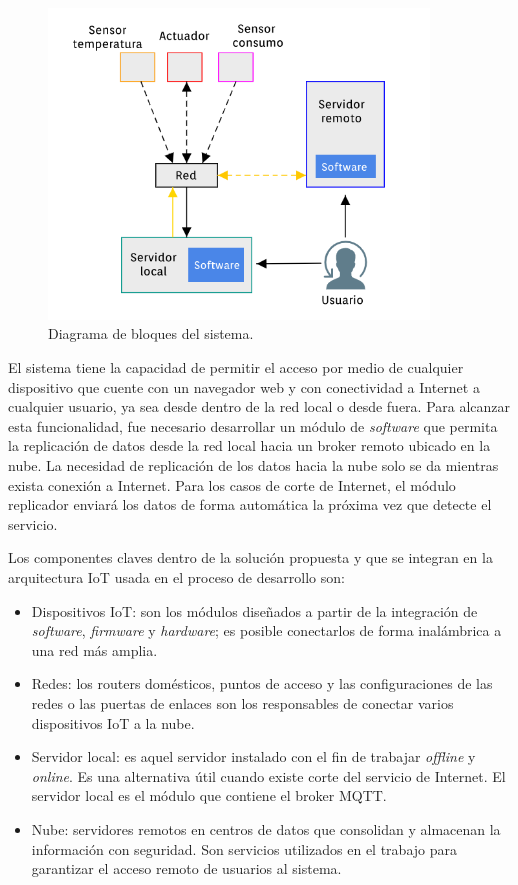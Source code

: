 \begin{figure}[htbp]
	\centering
	\includegraphics[width=0.9\textwidth]{./Figures/bloques.png}
	\caption{Diagrama de bloques del sistema.}

	\label{fig:diagrama1}
\end{figure}

El sistema tiene la capacidad de permitir el acceso por medio de cualquier dispositivo que cuente con un navegador web y con conectividad a Internet a cualquier usuario, ya sea desde dentro de la red local o desde fuera. Para alcanzar esta funcionalidad, fue necesario desarrollar un módulo de \emph{software} que permita la replicación de datos desde la red local hacia un broker remoto ubicado en la nube. La necesidad de replicación de los datos hacia la nube solo se da mientras exista conexión a Internet. Para los casos de corte de Internet, el módulo replicador enviará los datos de forma automática la próxima vez que detecte el servicio.%

Los componentes claves dentro de la solución propuesta y que se integran en la arquitectura IoT usada en el proceso de desarrollo son: 


\begin{itemize}
\item Dispositivos IoT: son los módulos diseñados a partir de la integración de \emph{software}, \emph{firmware} y \emph{hardware}; es posible conectarlos de forma inalámbrica a una red más amplia.
\item Redes: los routers domésticos, puntos de acceso y las configuraciones de las redes o las puertas de enlaces son los responsables de conectar varios dispositivos IoT a la nube.
\item Servidor local: es aquel servidor instalado con el fin de trabajar \emph{offline} y \emph{online}. Es una alternativa útil cuando existe corte del servicio de Internet. El servidor local es el módulo que contiene el broker MQTT. 
\item Nube: servidores remotos en centros de datos que consolidan y almacenan la información con seguridad. Son servicios utilizados en el trabajo para garantizar el acceso remoto de usuarios al sistema.
\end{itemize}

